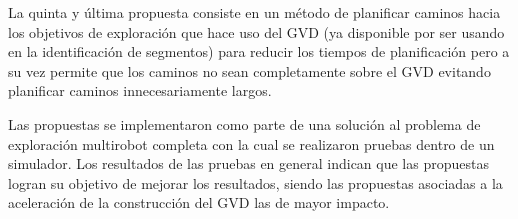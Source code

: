 La quinta y última propuesta consiste en un método de planificar caminos hacia
los objetivos de exploración que hace uso del GVD (ya disponible por ser usando
en la identificación de segmentos) para reducir los tiempos de planificación
pero a su vez permite que los caminos no sean completamente sobre el GVD evitando
planificar caminos innecesariamente largos.

Las propuestas se implementaron como parte de una solución al problema de
exploración multirobot completa con la cual se realizaron pruebas dentro de un
simulador. Los resultados de las pruebas en general indican que las propuestas
logran su objetivo de mejorar los resultados, siendo las propuestas asociadas a
la aceleración de la construcción del GVD las de mayor impacto.
